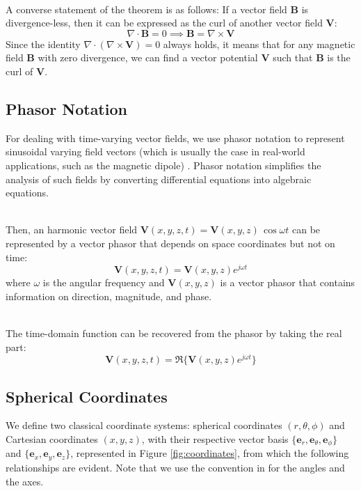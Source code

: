 \documentclass[main]{subfiles}
\begin{document}
\noindent\\
A converse statement of the theorem is as follows: 
If a vector field \(\mathbf{B}\) is divergence-less, then it can be expressed as 
the curl of another vector field \(\mathbf{V}\):
\[
\nabla \cdot \mathbf{B} = 0 \implies \mathbf{B} = \nabla \times \mathbf{V}
\]
Since the identity \(\nabla \cdot (\nabla \times \mathbf{V}) = 0\) always holds, 
it means that for any magnetic field \(\mathbf{B}\) with zero divergence, we can 
find a vector potential \(\mathbf{V}\) such that \(\mathbf{B}\) is the curl of 
\(\mathbf{V}\).

\subsection{Phasor Notation} \label{Phasor Notation}
For dealing with time-varying vector fields, we use phasor notation to represent 
sinusoidal varying field vectors (which is usually the case in real-world 
applications, such as the magnetic dipole) \cite{book-magnetism}. Phasor notation 
simplifies the analysis of such fields by converting differential equations into 
algebraic equations.

\noindent\\
Then, an harmonic vector field \( \mathbf{V}(x, y, z, t) = \mathbf{V}(x, y, z) 
\, \cos\omega t\) can be represented by a vector phasor that depends on space 
coordinates but not on time:
\[
\mathbf{V}(x, y, z, t) = \mathbf{V}(x, y, z) e^{j\omega t}
\]
where \(\omega\) is the angular frequency and \( \mathbf{V}(x, y, z) \) is a 
vector phasor that contains information on direction, magnitude, and phase.

\noindent\\
The time-domain function can be recovered from the phasor by taking the real part:
\[
\mathbf{V}(x, y, z, t) = \Re\{ \mathbf{V}(x, y, z) e^{j\omega t} \}
\]

\subsection{Spherical Coordinates} \label{Spherical Coordinates}
We define two classical coordinate systems: spherical coordinates $(r, \theta, 
\phi)$ and Cartesian coordinates \((x, y, z)\), with their respective vector 
basis \( \{\mathbf{e}_r, \mathbf{e}_{\theta}, \mathbf{e}_{\phi} \} \) and 
\( \{\mathbf{e}_x, \mathbf{e}_y, \mathbf{e}_z\} \), represented in Figure 
\ref{fig:coordinates}, from which the following relationships are evident. Note 
that we use the convention in \cite{main} for the angles and the axes. 
\end{document}
